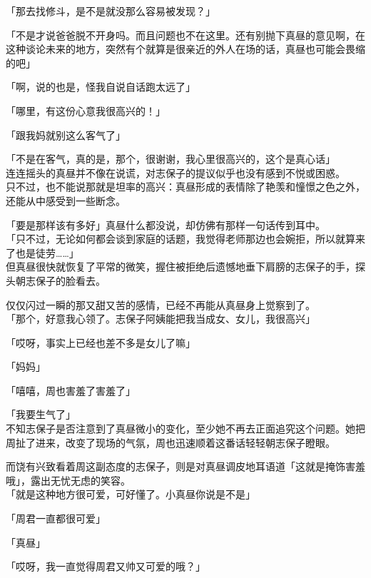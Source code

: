 「那去找修斗，是不是就没那么容易被发现？」

「不是才说爸爸脱不开身吗。而且问题也不在这里。还有别抛下真昼的意见啊，在这种谈论未来的地方，突然有个就算是很亲近的外人在场的话，真昼也可能会畏缩的吧」

「啊，说的也是，怪我自说自话跑太远了」

「哪里，有这份心意我很高兴的！」

「跟我妈就别这么客气了」

「不是在客气，真的是，那个，很谢谢，我心里很高兴的，这个是真心话」\\

连连摇头的真昼并不像在说谎，对志保子的提议似乎也没有感到不悦或困惑。\\

只不过，也不能说那就是坦率的高兴：真昼形成的表情除了艳羡和憧憬之色之外，还能从中感受到一些断念。

「要是那样该有多好」真昼什么都没说，却仿佛有那样一句话传到耳中。\\

「只不过，无论如何都会谈到家庭的话题，我觉得老师那边也会婉拒，所以就算来了也是徒劳……」\\

但真昼很快就恢复了平常的微笑，握住被拒绝后遗憾地垂下肩膀的志保子的手，探头朝志保子的脸看去。

仅仅闪过一瞬的那又甜又苦的感情，已经不再能从真昼身上觉察到了。\\

「那个，好意我心领了。志保子阿姨能把我当成女、女儿，我很高兴」

「哎呀，事实上已经也差不多是女儿了嘛」

「妈妈」

「嘻嘻，周也害羞了害羞了」

「我要生气了」\\

不知志保子是否注意到了真昼微小的变化，至少她不再去正面追究这个问题。她把周扯了进来，改变了现场的气氛，周也迅速顺着这番话轻轻朝志保子瞪眼。

而饶有兴致看着周这副态度的志保子，则是对真昼调皮地耳语道「这就是掩饰害羞哦」，露出无忧无虑的笑容。\\

「就是这种地方很可爱，可好懂了。小真昼你说是不是」

「周君一直都很可爱」

「真昼」

「哎呀，我一直觉得周君又帅又可爱的哦？」\\

